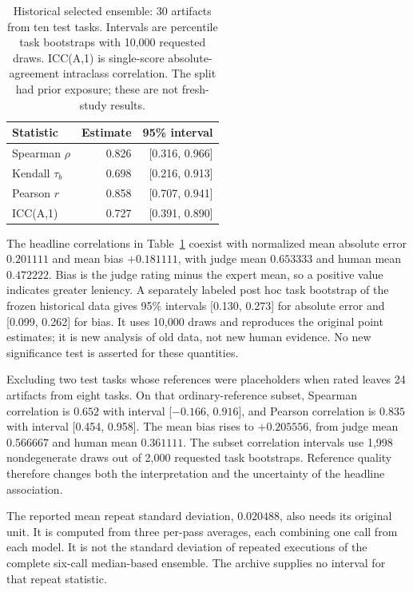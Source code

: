 \begin{table}[t]
\centering
\begin{tabular}{lrr}
\toprule
Statistic & Estimate & 95\% interval \\
\midrule
Spearman $\rho$ & 0.826 & [0.316, 0.966] \\
Kendall $\tau_b$ & 0.698 & [0.216, 0.913] \\
Pearson $r$ & 0.858 & [0.707, 0.941] \\
ICC(A,1) & 0.727 & [0.391, 0.890] \\
\bottomrule
\end{tabular}
\caption{Historical selected ensemble: 30 artifacts from ten test tasks.
Intervals are percentile task bootstraps with 10,000 requested draws.
ICC(A,1) is single-score absolute-agreement intraclass correlation.
The split had prior exposure; these are not fresh-study results.}
\label{tab:legacy}
\end{table}

The headline correlations in Table~\ref{tab:legacy} coexist with normalized mean absolute error $0.201111$ and mean bias $+0.181111$, with judge mean $0.653333$ and human mean $0.472222$.
Bias is the judge rating minus the expert mean, so a positive value indicates greater leniency.
A separately labeled post hoc task bootstrap of the frozen historical data gives 95\% intervals [0.130, 0.273] for absolute error and [0.099, 0.262] for bias.
It uses 10,000 draws and reproduces the original point estimates; it is new analysis of old data, not new human evidence.
No new significance test is asserted for these quantities.

Excluding two test tasks whose references were placeholders when rated leaves 24 artifacts from eight tasks.
On that ordinary-reference subset, Spearman correlation is $0.652$ with interval [$-0.166$, $0.916$], and Pearson correlation is $0.835$ with interval [0.454, 0.958].
The mean bias rises to $+0.205556$, from judge mean $0.566667$ and human mean $0.361111$.
The subset correlation intervals use 1,998 nondegenerate draws out of 2,000 requested task bootstraps.
Reference quality therefore changes both the interpretation and the uncertainty of the headline association.

The reported mean repeat standard deviation, $0.020488$, also needs its original unit.
It is computed from three per-pass averages, each combining one call from each model.
It is not the standard deviation of repeated executions of the complete six-call median-based ensemble.
The archive supplies no interval for that repeat statistic.


